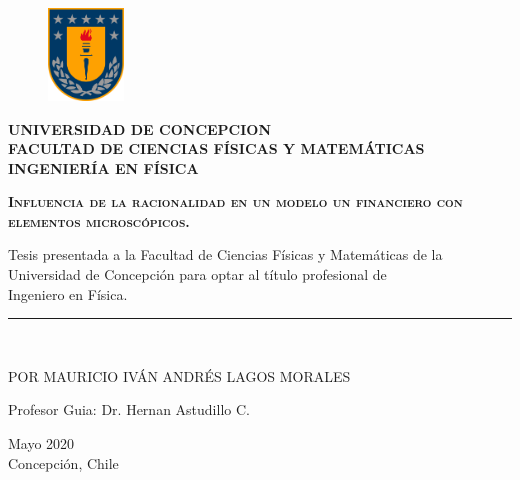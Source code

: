 \documentclass[a4paper,openright,12pt]{report}
\begin{document}
\begin{titlepage}

\begin{center}
\vspace*{-1in}
\begin{figure}[htb]
\begin{center}
\includegraphics[width=2cm]{escudo.png}
\end{center}
\end{figure}
\begin{center}
\textbf{
UNIVERSIDAD DE CONCEPCION\\
FACULTAD DE CIENCIAS FÍSICAS Y MATEMÁTICAS\\
INGENIERÍA EN FÍSICA}
\end{center}
\vspace*{0.4in}
\begin{Large}
\textsc{\textbf{Influencia de la racionalidad en un modelo un financiero con elementos microscópicos.}}\\
\end{Large}
\vspace*{0.2in}
Tesis presentada a la Facultad de Ciencias Físicas y Matemáticas de la Universidad de Concepción para optar al título profesional de \\Ingeniero en Física.\\
\rule{80mm}{0.1mm}\\

\vspace*{0.2in}

\end{center}

\begin{flushright}
\begin{large}
POR MAURICIO IVÁN ANDRÉS LAGOS MORALES\\ 
\end{large}
\begin{large}
Profesor Guia: Dr. Hernan Astudillo C. \\
\end{large}
\end{flushright}
\vspace*{0.1in}
\begin{center}
Mayo 2020\\
Concepción, Chile 
\end{center}
\end{titlepage}
\end{document}
